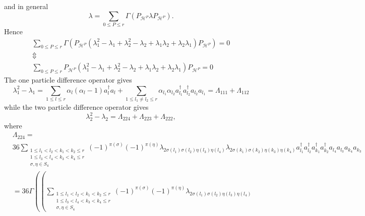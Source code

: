 \documentclass[aps,preprint]{revtex4}%
\begin{document}
\begin{itemize}
\begin{equation}
\end{equation}
and in general
\begin{equation}
\lambda=\sum_{0\leq P\leq r}\Gamma\left(  P_{\mathcal{H}^{P}}\lambda
P_{\mathcal{H}^{P}}\right)  .
\end{equation}
Hence
\begin{gather}
\sum_{0\leq P\leq r}\Gamma\left(  P_{\mathcal{H}^{P}}\left(  \lambda_{1}%
^{2}-\lambda_{1}+\lambda_{2}^{2}-\lambda_{2}+\lambda_{1}\lambda_{2}%
+\lambda_{2}\lambda_{1}\right)  P_{\mathcal{H}^{P}}\right)  =0\\
\Updownarrow\\
\sum_{0\leq P\leq r}P_{\mathcal{H}^{P}}\left(  \lambda_{1}^{2}-\lambda
_{1}+\lambda_{2}^{2}-\lambda_{2}+\lambda_{1}\lambda_{2}+\lambda_{2}\lambda
_{1}\right)  P_{\mathcal{H}^{P}}=0
\end{gather}
The one particle difference operator gives%
\[
\lambda_{1}^{2}-\lambda_{1}=\sum_{1\leq l\leq r}\alpha_{l}\left(  \alpha
_{l}-1\right)  a_{l}^{\dagger}a_{l}+\sum_{1\leq l_{1}\neq l_{2}\leq r}%
\alpha_{l_{1}}\alpha_{l_{2}}a_{l_{1}}^{\dagger}a_{l_{2}}^{\dagger}a_{l_{2}%
}a_{l_{1}}=\Lambda_{111}+\Lambda_{112}%
\]
while the two particle difference operator gives%
\begin{equation}
\lambda_{2}^{2}-\lambda_{2}=\Lambda_{224}+\Lambda_{223}+\Lambda_{222},
\end{equation}
where
\begin{align}
&  \Lambda_{224}=\\
&  36\sum_{\substack{1\leq l_{1}<l_{2}<k_{1}<k_{2}\leq r\\1\leq l_{3}%
<l_{4}<k_{3}<k_{4}\leq r\\\sigma,\eta\in S_{4}}}\left(  -1\right)
^{\pi\left(  \sigma\right)  }\left(  -1\right)  ^{\pi\left(  \eta\right)
}\lambda_{2\sigma\left(  l_{1}\right)  \sigma\left(  l_{2}\right)  \eta\left(
l_{3}\right)  \eta\left(  l_{4}\right)  }\lambda_{2\sigma\left(  k_{1}\right)
\sigma\left(  k_{2}\right)  \eta\left(  k_{3}\right)  \eta\left(
k_{4}\right)  }a_{l_{1}}^{\dagger}a_{l_{2}}^{\dagger}a_{k_{1}}^{\dagger
}a_{k_{2}}^{\dagger}a_{l_{4}}a_{l_{3}}a_{k_{4}}a_{k_{3}}\\
&  =36\Gamma\left(  \left(  \sum_{\substack{1\leq l_{1}<l_{2}<k_{1}<k_{2}\leq
r\\1\leq l_{3}<l_{4}<k_{3}<k_{4}\leq r\\\sigma,\eta\in S_{4}}}\left(
-1\right)  ^{\pi\left(  \sigma\right)  }\left(  -1\right)  ^{\pi\left(
\eta\right)  }\lambda_{2\sigma\left(  l_{1}\right)  \sigma\left(
l_{2}\right)  \eta\left(  l_{3}\right)  \eta\left(  l_{4}\right)  }%

\end{align}
\end{itemize}
\end{document}
